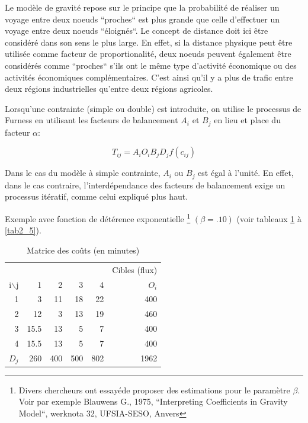 Le modèle de gravité repose sur le principe que la probabilité de réaliser un
voyage entre deux noeuds ``proches`` est plus grande que celle d'effectuer un
voyage entre deux noeuds ``éloignés``. Le concept de distance doit ici être
consi\-déré dans son sens le plus large. En effet, si la distance physique peut
être utilisée comme facteur de proportionalité, deux noeuds peuvent également
être consi\-dérés comme ``proches`` s'ils ont le même type d'activité économique
ou des activités économiques complémentaires. C'est ainsi qu'il y a plus de
trafic entre deux régions industrielles qu'entre deux régions agricoles.

Lorsqu'une contrainte (simple ou double) est introduite, on utilise
le processus de Furness en utilisant les facteurs de balancement
$A_i$ et $B_j$ en lieu et place du facteur $\alpha$:

$$T_{ij}=A_iO_iB_jD_jf(c_{ij})$$

Dans le cas du modèle à simple contrainte, $A_i$ ou $B_j$ est égal
à l'unité. En effet, dans le cas contraire, l'interdépendance des
facteurs de balancement exige un processus itératif, comme celui
expliqué plus haut.

Exemple avec fonction de détérence exponentielle %
\footnote{Divers chercheurs ont essayéde proposer des estimations pour le
paramètre $\beta$. Voir par exemple Blauwens G., 1975, ``Interpreting
Coefficients in Gravity Model``, werknota 32, UFSIA-SESO, Anvers} $(\beta
=.10)$ (voir tableaux \ref{tab2_3} à \ref{tab2_5}).

\begin{table}[htbp]
\begin{center}
\begin{tabular}{rrrrrr}
\hline
 & & & & & Cibles (flux)\\
i$\backslash$j & 1 & 2 & 3 & 4 & $O_i$\\
\hline
1 & 3 & 11 & 18 & 22 & 400\\

2 & 12 & 3 & 13 & 19 & 460\\

3 & 15.5 & 13 & 5 & 7 & 400\\

4 & 15.5 & 13 & 5 & 7 & 400\\

$D_j$ & 260 & 400 & 500 & 802 & 1962\\
\hline
\end{tabular}
\caption{\label{tab2_3} Matrice des co\^uts (en minutes)}
\end{center}
\end{table}




